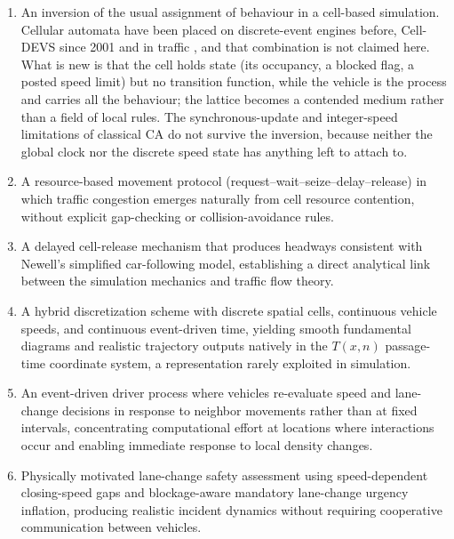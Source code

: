 \documentclass[review,number]{elsarticle}
\begin{document}
\begin{enumerate}
    \renewcommand{\theenumi}{\roman{enumi}}\renewcommand{\labelenumi}{\theenumi)}
    \item An inversion of the usual assignment of behaviour in a cell-based simulation. Cellular automata have been placed on discrete-event engines before, Cell-DEVS \citep{wainer2001timed,wainer2014cellular} since 2001 and in traffic \citep{davidson2000specifying,wainer2006atlas}, and that combination is not claimed here. What is new is that the cell holds state (its occupancy, a blocked flag, a posted speed limit) but no transition function, while the vehicle is the process and carries all the behaviour; the lattice becomes a contended medium rather than a field of local rules. The synchronous-update and integer-speed limitations of classical CA do not survive the inversion, because neither the global clock nor the discrete speed state has anything left to attach to.

    \item A resource-based movement protocol (request--wait--seize--delay--release) in which traffic congestion emerges naturally from cell resource contention, without explicit gap-checking or collision-avoidance rules.

    \item A delayed cell-release mechanism that produces headways consistent with Newell's simplified car-following model, establishing a direct analytical link between the simulation mechanics and traffic flow theory.

    \item A hybrid discretization scheme with discrete spatial cells, continuous vehicle speeds, and continuous event-driven time, yielding smooth fundamental diagrams and realistic trajectory outputs natively in the $T(x,n)$ passage-time coordinate system, a representation rarely exploited in simulation.

    \item An event-driven driver process where vehicles re-evaluate speed and lane-change decisions in response to neighbor movements rather than at fixed intervals, concentrating computational effort at locations where interactions occur and enabling immediate response to local density changes.

    \item Physically motivated lane-change safety assessment using speed-dependent closing-speed gaps and blockage-aware mandatory lane-change urgency inflation, producing realistic incident dynamics without requiring cooperative communication between vehicles.


\end{enumerate}
\end{document}
